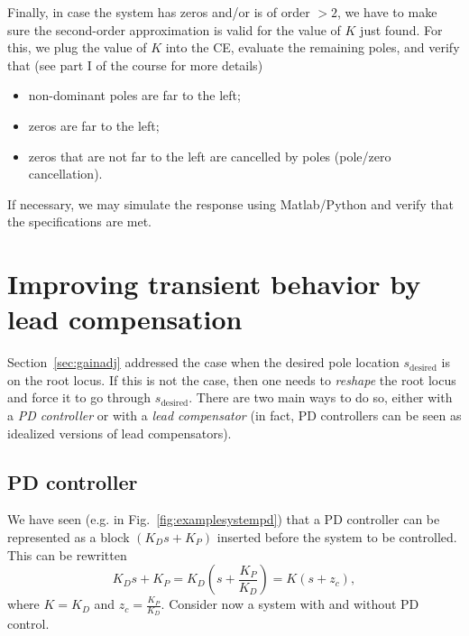 \documentclass[a4paper,11pt]{report}
\theoremstyle{definition}
\newcommand{\des}{\textrm{desired}}
\begin{document}
Finally, in case the system has zeros and/or is of order $>2$, we have
to make sure the second-order approximation is valid for the value of
$K$ just found. For this, we plug the value of $K$ into the CE,
evaluate the remaining poles, and verify that (see part I of the
course for more details)
\begin{itemize}
\item non-dominant poles are far to the left;
\item zeros are far to the left;
\item zeros that are not far to the left are cancelled by poles
  (pole/zero cancellation).
\end{itemize}

If necessary, we may simulate the response using Matlab/Python and
verify that the specifications are met.


\section{Improving transient behavior by lead compensation}

Section~\ref{sec:gainadj} addressed the case when the desired pole
location $s_\des$ is on the root locus. If this is not the case, then
one needs to \emph{reshape} the root locus and force it to go through
$s_\des$. There are two main ways to do so, either with a \emph{PD
  controller} or with a \emph{lead compensator} (in fact, PD
controllers can be seen as idealized versions of lead compensators).

\subsection{PD controller}
\label{sec:pddesign}

We have seen (e.g. in Fig.~\ref{fig:examplesystempd}) that a PD
controller can be represented as a block $(K_Ds+K_P)$ inserted before
the system to be controlled. This can be rewritten
\[
K_Ds+K_P = K_D\left(s+\frac{K_P}{K_D}\right) = K(s+z_c),
\]
where $K=K_D$ and $z_c=\frac{K_P}{K_D}$. Consider now a system with
and without PD control.
\end{document}
